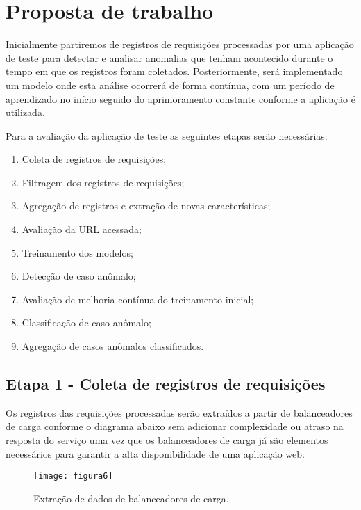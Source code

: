 
\chapter{Proposta de trabalho}
\label{cap:proposta-de-trabalho}

Inicialmente partiremos de registros de requisições processadas por uma aplicação
de teste para detectar e analisar anomalias que tenham acontecido durante o tempo
em que os registros foram coletados. Posteriormente, será implementado um modelo
onde esta análise ocorrerá de forma contínua, com um período de aprendizado no
início seguido do aprimoramento constante conforme a aplicação é utilizada.

Para a avaliação da aplicação de teste as seguintes etapas serão necessárias:

\begin{enumerate}
  \item Coleta de registros de requisições;
  \item Filtragem dos registros de requisições;
  \item Agregação de registros e extração de novas características;
  \item Avaliação da URL acessada;
  \item Treinamento dos modelos;
  \item Detecção de caso anômalo;
  \item Avaliação de melhoria contínua do treinamento inicial;
  \item Classificação de caso anômalo;
  \item Agregação de casos anômalos classificados.
\end{enumerate}

\section{Etapa 1 - Coleta de registros de requisições}
\label{sec:etapa-1}

Os registros das requisições processadas serão extraídos a partir de balanceadores
de carga conforme o diagrama abaixo sem adicionar complexidade ou atraso na resposta
do serviço uma vez que os balanceadores de carga já são elementos necessários para
garantir a alta disponibilidade de uma aplicação web.

\begin{figure}
  \centering
  \texttt{[image: figura6]}
  \caption{Extração de dados de balanceadores de carga.\label{fig:extracao-de-dados-de-balanceadores-de-carga}}
\end{figure}

